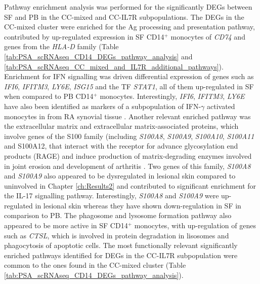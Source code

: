 Pathway enrichment analysis was performed for the significantly DEGs between SF and PB in the CC-mixed and CC-IL7R subpopulations. The DEGs in the CC-mixed cluster were enriched for the Ag processing and presentation pathway, contributed by up-regulated expression in SF CD14$^+$ monocytes of \textit{CD74} and genes from the \textit{HLA-D} family \parencite{Lamb1992} (Table \ref{tab:PSA_scRNAseq_CD14_DEGs_pathway_analysis} and \ref{tab:PSA_scRNAseq_CC_mixed_and_IL7R_additional_pathways}). Enrichment for IFN signalling was driven differential expression of genes such as \textit{IFI6}, \textit{IFITM3}, \textit{LY6E}, \textit{ISG15} and the TF \textit{STAT1}, all of them up-regulated in SF when compared to PB CD14$^+$ monocytes. Interestingly, \textit{IFI6}, \textit{IFITM3}, \textit{LY6E} have also been identified as markers of a subpopulation of IFN-$\gamma$ activated monocytes in from RA synovial tissue \parencite{Zhang2018}. Another relevant enriched pathway was the extracellular matrix and extracellular matrix-associated proteins, which involve genes of the S100 family (including \textit{S100A8}, \textit{S100A9}, \textit{S100A10}, \textit{S100A11} and S100A12, that interact with the receptor for advance glycosylation end products (RAGE) and induce production of matrix-degrading enzymes involved in joint erosion and development of arthritis \parencite{Raghunatha2012}. Two genes of this family, \textit{S100A8} and \textit{S100A9} also appeared to be dysregulated in lesional skin compared to uninvolved in Chapter \ref{ch:Results2} and contributed to significant enrichment for the IL-17 signalling pathway. Interestingly, \textit{S100A8} and \textit{S100A9} were up-regulated in lesional skin whereas they have shown down-regulation in SF in comparison to PB. The phagosome and lysosome formation pathway also appeared to be more active in SF CD14$^+$ monocytes, with up-regulation of genes such as \textit{CTSL}, which is involved in protein degradation in lisosomes and phagocytosis of apoptotic cells. %
The most functionally relevant significantly enriched pathways identified for DEGs in the CC-IL7R subpopulation were common to the ones found in the CC-mixed cluster (Table \ref{tab:PSA_scRNAseq_CD14_DEGs_pathway_analysis}).


